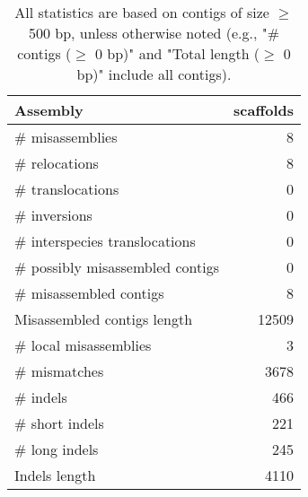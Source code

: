 \documentclass[12pt,a4paper]{article}
\begin{document}
\begin{table}[ht]
\begin{center}
\caption{All statistics are based on contigs of size $\geq$ 500 bp, unless otherwise noted (e.g., "\# contigs ($\geq$ 0 bp)" and "Total length ($\geq$ 0 bp)" include all contigs).}
\begin{tabular}{|l*{1}{|r}|}
\hline
Assembly & scaffolds \\ \hline
\# misassemblies & 8 \\ \hline
\hspace{5mm}\# relocations & 8 \\ \hline
\hspace{5mm}\# translocations & 0 \\ \hline
\hspace{5mm}\# inversions & 0 \\ \hline
\hspace{5mm}\# interspecies translocations & 0 \\ \hline
\# possibly misassembled contigs & 0 \\ \hline
\# misassembled contigs & 8 \\ \hline
Misassembled contigs length & 12509 \\ \hline
\# local misassemblies & 3 \\ \hline
\# mismatches & 3678 \\ \hline
\# indels & 466 \\ \hline
\hspace{5mm}\# short indels & 221 \\ \hline
\hspace{5mm}\# long indels & 245 \\ \hline
Indels length & 4110 \\ \hline
\end{tabular}
\end{center}
\end{table}
\end{document}
